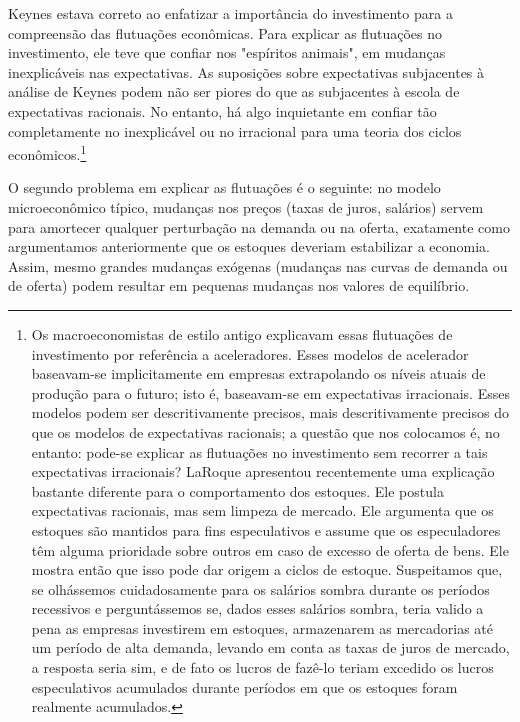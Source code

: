 \documentclass[12pt]{article}
\begin{document}
Keynes estava correto ao enfatizar a importância do investimento para a compreensão das flutuações econômicas. Para explicar as flutuações no investimento, ele teve que confiar nos "espíritos animais", em mudanças inexplicáveis nas expectativas. As suposições sobre expectativas subjacentes à análise de Keynes podem não ser piores do que as subjacentes à escola de expectativas racionais. No entanto, há algo inquietante em confiar tão completamente no inexplicável ou no irracional para uma teoria dos ciclos econômicos.\footnote{Os macroeconomistas de estilo antigo explicavam essas flutuações de investimento por referência a aceleradores. Esses modelos de acelerador baseavam-se implicitamente em empresas extrapolando os níveis atuais de produção para o futuro; isto é, baseavam-se em expectativas irracionais. Esses modelos podem ser descritivamente precisos, mais descritivamente precisos do que os modelos de expectativas racionais; a questão que nos colocamos é, no entanto: pode-se explicar as flutuações no investimento sem recorrer a tais expectativas irracionais? LaRoque apresentou recentemente uma explicação bastante diferente para o comportamento dos estoques. Ele postula expectativas racionais, mas sem limpeza de mercado. Ele argumenta que os estoques são mantidos para fins especulativos e assume que os especuladores têm alguma prioridade sobre outros em caso de excesso de oferta de bens. Ele mostra então que isso pode dar origem a ciclos de estoque. Suspeitamos que, se olhássemos cuidadosamente para os salários sombra durante os períodos recessivos e perguntássemos se, dados esses salários sombra, teria valido a pena as empresas investirem em estoques, armazenarem as mercadorias até um período de alta demanda, levando em conta as taxas de juros de mercado, a resposta seria sim, e de fato os lucros de fazê-lo teriam excedido os lucros especulativos acumulados durante períodos em que os estoques foram realmente acumulados.}

O segundo problema em explicar as flutuações é o seguinte: no modelo microeconômico típico, mudanças nos preços (taxas de juros, salários) servem para amortecer qualquer perturbação na demanda ou na oferta, exatamente como argumentamos anteriormente que os estoques deveriam estabilizar a economia. Assim, mesmo grandes mudanças exógenas (mudanças nas curvas de demanda ou de oferta) podem resultar em pequenas mudanças nos valores de equilíbrio.
\end{document}
